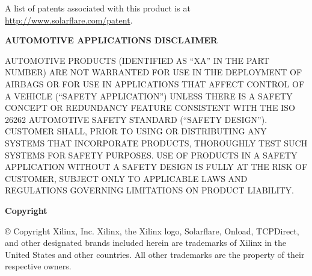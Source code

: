 A list of patents associated with this product is at 
\href{http://www.solarflare.com/patent}{http://www.solarflare.com/patent}.

{\bfseries AUTOMOTIVE APPLICATIONS DISCLAIMER}

AUTOMOTIVE PRODUCTS (IDENTIFIED AS “XA” IN THE PART NUMBER) ARE NOT WARRANTED 
FOR USE IN THE DEPLOYMENT OF AIRBAGS OR FOR USE IN APPLICATIONS THAT AFFECT 
CONTROL OF A VEHICLE (“SAFETY APPLICATION”) UNLESS THERE IS A SAFETY CONCEPT 
OR REDUNDANCY FEATURE CONSISTENT WITH THE ISO 26262 AUTOMOTIVE SAFETY 
STANDARD (“SAFETY DESIGN”). CUSTOMER SHALL, PRIOR TO USING OR DISTRIBUTING 
ANY SYSTEMS THAT INCORPORATE PRODUCTS, THOROUGHLY TEST SUCH SYSTEMS FOR 
SAFETY PURPOSES. USE OF PRODUCTS IN A SAFETY APPLICATION WITHOUT A SAFETY 
DESIGN IS FULLY AT THE RISK OF CUSTOMER, SUBJECT ONLY TO APPLICABLE LAWS AND 
REGULATIONS GOVERNING LIMITATIONS ON PRODUCT LIABILITY.

{\bfseries Copyright}

© Copyright \the\year{} Xilinx, Inc. Xilinx, the Xilinx logo, Solarflare, 
Onload, TCPDirect, and other designated brands included herein are trademarks 
of Xilinx in the United States and other countries. All other trademarks are 
the property of their respective owners.
